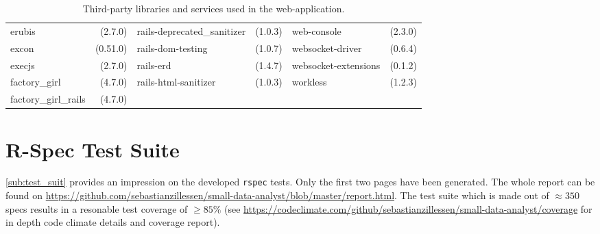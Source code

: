 \begin{table}[!h]
\begin{tabular}{|p{2.4cm}r||p{2.4cm}r||p{2.4cm}r|}
erubis&(2.7.0)&\tiny{rails-deprecated\_sanitizer}&(1.0.3)&web-console&(2.3.0)\\
excon&(0.51.0)&\tiny{rails-dom-testing}&(1.0.7)&\tiny{websocket-driver}&(0.6.4)\\
execjs&(2.7.0)&rails-erd&(1.4.7)&\tiny{websocket-extensions}&(0.1.2)\\
factory\_girl&(4.7.0)&\tiny{rails-html-sanitizer}&(1.0.3)&workless&(1.2.3)\\
factory\_girl\_rails&(4.7.0)&&&&\\
	\hline
	\end{tabular}
	\caption{Third-party libraries and services used in the web-application.}
	\label{tab:libs}
\end{table}

\clearpage
\newpage

\section{R-Spec Test Suite}
\label{app:d}
\label{app:rspec}
\sloppy
\autoref{sub:test_suit} provides an impression on the developed \texttt{rspec} tests. Only the first two pages have been generated. The whole report can be found on \href{https://github.com/sebastianzillessen/small-data-analyst/blob/master/report.html}{https://github.com/sebastianzillessen/small-data-analyst/blob/master/report.html}. The test suite which is made out of $\approx 350$ specs results in a resonable test coverage of $\geq 85\%$ (see \href{https://codeclimate.com/github/sebastianzillessen/small-data-analyst/coverage}{https://codeclimate.com/github/sebastianzillessen/small-data-analyst/coverage} for in depth code climate details and coverage report).
